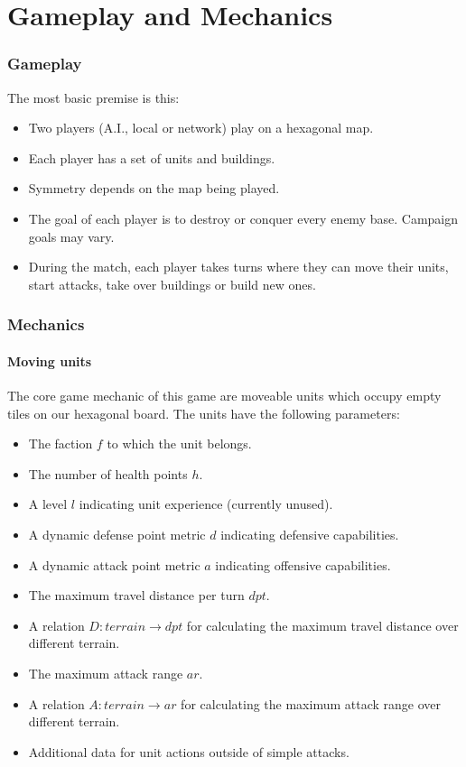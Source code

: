 \part{Gameplay and Mechanics}
\section{Gameplay}
The most basic premise is this:

\begin{itemize}
\item Two players (A.I., local or network) play on a hexagonal map.
\item Each player has a set of units and buildings.
\item Symmetry depends on the map being played.
\item The goal of each player is to destroy or conquer every enemy base. Campaign goals may vary.
\item During the match, each player takes turns where they can move their units, start attacks, take over buildings or build new ones.
\end{itemize}
\section{Mechanics}
\subsection{Moving units} %
The core game mechanic of this game are moveable units which occupy empty tiles on our hexagonal board.
The units have the following parameters:

\begin{itemize}
    \item The faction $f$ to which the unit belongs.
    \item The number of health points $h$.
    \item A level $l$ indicating unit experience (currently unused).
    \item A dynamic defense point metric $d$ indicating defensive capabilities.
    \item A dynamic attack point metric $a$ indicating offensive capabilities.
    \item The maximum travel distance per turn $dpt$.
    \item A relation $D: terrain \to dpt$ for calculating the maximum travel distance over different terrain.
    \item The maximum attack range $ar$.
    \item A relation $A: terrain \to ar$ for calculating the maximum attack range over different terrain.
    \item Additional data for unit actions outside of simple attacks.
\end{itemize}
